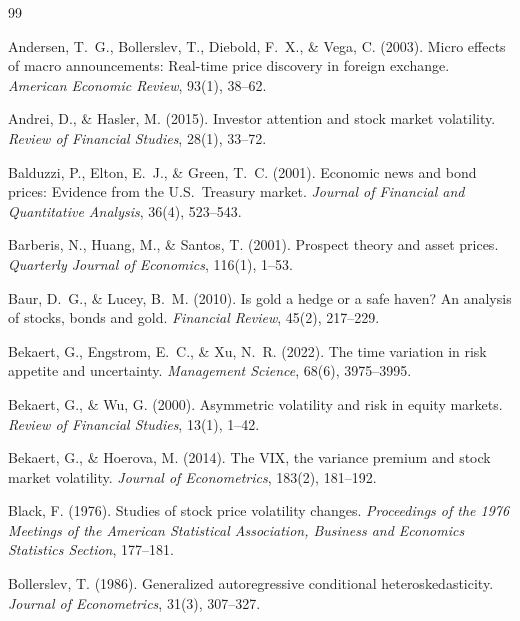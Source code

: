 \documentclass[12pt,a4paper]{article}
\begin{document}
\begin{thebibliography}{99}

Andersen, T.~G., Bollerslev, T., Diebold, F.~X., \& Vega, C. (2003). Micro effects of macro announcements: Real-time price discovery in foreign exchange. \textit{American Economic Review}, 93(1), 38--62.

Andrei, D., \& Hasler, M. (2015). Investor attention and stock market volatility. \textit{Review of Financial Studies}, 28(1), 33--72.

Balduzzi, P., Elton, E.~J., \& Green, T.~C. (2001). Economic news and bond prices: Evidence from the U.S.\ Treasury market. \textit{Journal of Financial and Quantitative Analysis}, 36(4), 523--543.

Barberis, N., Huang, M., \& Santos, T. (2001). Prospect theory and asset prices. \textit{Quarterly Journal of Economics}, 116(1), 1--53.

Baur, D.~G., \& Lucey, B.~M. (2010). Is gold a hedge or a safe haven? An analysis of stocks, bonds and gold. \textit{Financial Review}, 45(2), 217--229.

Bekaert, G., Engstrom, E.~C., \& Xu, N.~R. (2022). The time variation in risk appetite and uncertainty. \textit{Management Science}, 68(6), 3975--3995.

Bekaert, G., \& Wu, G. (2000). Asymmetric volatility and risk in equity markets. \textit{Review of Financial Studies}, 13(1), 1--42.

Bekaert, G., \& Hoerova, M. (2014). The VIX, the variance premium and stock market volatility. \textit{Journal of Econometrics}, 183(2), 181--192.

Black, F. (1976). Studies of stock price volatility changes. \textit{Proceedings of the 1976 Meetings of the American Statistical Association, Business and Economics Statistics Section}, 177--181.

Bollerslev, T. (1986). Generalized autoregressive conditional heteroskedasticity. \textit{Journal of Econometrics}, 31(3), 307--327.


\end{thebibliography}
\end{document}
